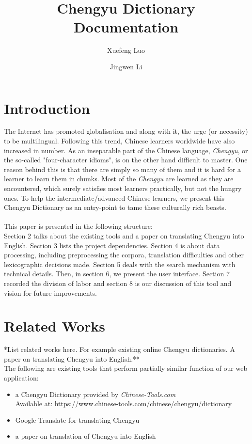 \documentclass[11pt]{article} %
\title{Chengyu Dictionary Documentation} %
\author{Xuefeng Luo \and Jingwen Li}
\date{}	%
\begin{document}
\maketitle

\section{Introduction}
\indent The Internet has promoted globalisation and along with it, the urge (or necessity) to be multilingual. Following this trend, Chinese learners worldwide have also increased in number. As an inseparable part of the Chinese language, \textit{Chengyu}, or the so-called "four-character idioms", is on the other hand difficult to master. One reason behind this is that there are simply so many of them and it is hard for a learner to learn them in chunks. Most of the \textit{Chengyu} are learned as they are encountered, which surely satisfies most learners practically, but not the hungry ones. To help the intermediate/advanced Chinese learners, we present this Chengyu Dictionary as an entry-point to tame these culturally rich beasts.\\
\\
\indent This paper is presented in the following structure:\\
Section 2 talks about the existing tools and a paper on translating Chengyu into English. Section 3 lists the project dependencies. Section 4 is about data processing, including preprocessing the corpora, translation difficulties and other lexicographic decisions made. Section 5 deals with the search mechanism with technical details. Then, in section 6, we present the user interface. Section 7 recorded the division of labor and section 8 is our discussion of this tool and vision for future improvements.

\section{Related Works}
\indent **List related works here. For example existing online Chengyu dictionaries. A paper on translating Chengyu into English.**\\
The following are existing tools that perform partially similar function of our web application:
\begin{itemize}
\item a Chengyu Dictionary provided by \textit{Chinese-Tools.com}\\
Available at: https://www.chinese-tools.com/chinese/chengyu/dictionary
\item Google-Translate for translating Chengyu
\item a paper on translation of Chengyu into English
\end{itemize}
\end{document}
